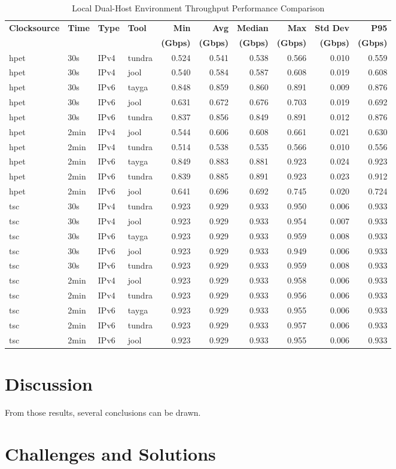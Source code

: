 \begin{table}[htbp]
\centering
\caption{Local Dual-Host Environment Throughput Performance Comparison}
\label{tab:throughput_comparison_localdouble}
\footnotesize
\begin{tabular}{|l|l|l|l|r|r|r|r|r|r|}
\hline
\textbf{Clocksource} & \textbf{Time} & \textbf{Type} & \textbf{Tool} & \textbf{Min} & \textbf{Avg} & \textbf{Median} & \textbf{Max} & \textbf{Std Dev} & \textbf{P95} \\
 & & & & \textbf{(Gbps)} & \textbf{(Gbps)} & \textbf{(Gbps)} & \textbf{(Gbps)} & \textbf{(Gbps)} & \textbf{(Gbps)} \\
\hline
hpet & 30s & IPv4 & tundra & 0.524 & 0.541 & 0.538 & 0.566 & 0.010 & 0.559 \\
hpet & 30s & IPv4 & jool & 0.540 & 0.584 & 0.587 & 0.608 & 0.019 & 0.608 \\
hpet & 30s & IPv6 & tayga & 0.848 & 0.859 & 0.860 & 0.891 & 0.009 & 0.876 \\
hpet & 30s & IPv6 & jool & 0.631 & 0.672 & 0.676 & 0.703 & 0.019 & 0.692 \\
hpet & 30s & IPv6 & tundra & 0.837 & 0.856 & 0.849 & 0.891 & 0.012 & 0.876 \\
hpet & 2min & IPv4 & jool & 0.544 & 0.606 & 0.608 & 0.661 & 0.021 & 0.630 \\
hpet & 2min & IPv4 & tundra & 0.514 & 0.538 & 0.535 & 0.566 & 0.010 & 0.556 \\
hpet & 2min & IPv6 & tayga & 0.849 & 0.883 & 0.881 & 0.923 & 0.024 & 0.923 \\
hpet & 2min & IPv6 & tundra & 0.839 & 0.885 & 0.891 & 0.923 & 0.023 & 0.912 \\
hpet & 2min & IPv6 & jool & 0.641 & 0.696 & 0.692 & 0.745 & 0.020 & 0.724 \\
\hline
tsc & 30s & IPv4 & tundra & 0.923 & 0.929 & 0.933 & 0.950 & 0.006 & 0.933 \\
tsc & 30s & IPv4 & jool & 0.923 & 0.929 & 0.933 & 0.954 & 0.007 & 0.933 \\
tsc & 30s & IPv6 & tayga & 0.923 & 0.929 & 0.933 & 0.959 & 0.008 & 0.933 \\
tsc & 30s & IPv6 & jool & 0.923 & 0.929 & 0.933 & 0.949 & 0.006 & 0.933 \\
tsc & 30s & IPv6 & tundra & 0.923 & 0.929 & 0.933 & 0.959 & 0.008 & 0.933 \\
tsc & 2min & IPv4 & jool & 0.923 & 0.929 & 0.933 & 0.958 & 0.006 & 0.933 \\
tsc & 2min & IPv4 & tundra & 0.923 & 0.929 & 0.933 & 0.956 & 0.006 & 0.933 \\
tsc & 2min & IPv6 & tayga & 0.923 & 0.929 & 0.933 & 0.955 & 0.006 & 0.933 \\
tsc & 2min & IPv6 & tundra & 0.923 & 0.929 & 0.933 & 0.957 & 0.006 & 0.933 \\
tsc & 2min & IPv6 & jool & 0.923 & 0.929 & 0.933 & 0.955 & 0.006 & 0.933 \\
\hline
\end{tabular}
\end{table}

\section{Discussion}

From those results, several conclusions can be drawn. 

\section{Challenges and Solutions}